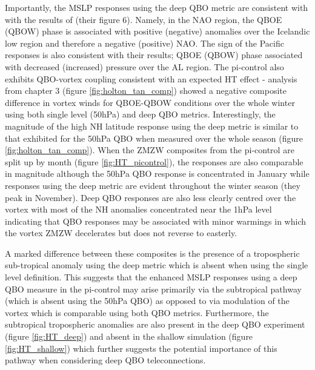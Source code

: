 Importantly, the MSLP responses using the deep QBO metric are consistent with with the results of \cite{andrewsObserved2019d} (their figure 6). Namely, in the NAO region, the QBOE (QBOW) phase is associated with positive (negative) anomalies over the Icelandic low region and therefore a negative (positive) NAO. The sign of the Pacific responses is also consistent with their results; QBOE (QBOW) phase associated with decreased (increased) pressure over the AL region. The pi-control also exhibits QBO-vortex coupling consistent with an expected HT effect - analysis from chapter 3 (figure \ref{fig:holton_tan_comp}) showed a negative composite difference in vortex winds for QBOE-QBOW conditions over the whole winter using both single level (50hPa) and deep QBO metrics. Interestingly, the magnitude of the high NH latitude response using the deep metric is similar to that exhibited for the 50hPa QBO when measured over the whole season (figure \ref{fig:holton_tan_comp}). When the ZMZW composites from the pi-control are split up by month (figure \ref{fig:HT_picontrol}), the responses are also comparable in magnitude although the 50hPa QBO response is concentrated in January while responses using the deep metric are evident throughout the winter season (they peak in November). Deep QBO responses are also less clearly centred over the vortex with most of the NH anomalies concentrated near the 1hPa level indicating that QBO responses may be associated with minor warmings in which the vortex ZMZW decelerates but does not reverse to easterly. 

A marked difference between these composites is the presence of a tropospheric sub-tropical anomaly using the deep metric which is absent when using the single level definition. This suggests that the enhanced MSLP responses using a deep QBO measure in the pi-control may arise primarily via the subtropical pathway (which is absent using the 50hPa QBO) as opposed to via modulation of the vortex which is comparable using both QBO metrics. Furthermore, the subtropical tropospheric anomalies are also present in the deep QBO experiment (figure \ref{fig:HT_deep}) and absent in the shallow simulation (figure \ref{fig:HT_shallow}) which further suggests the potential importance of this pathway when considering deep QBO teleconnections.

